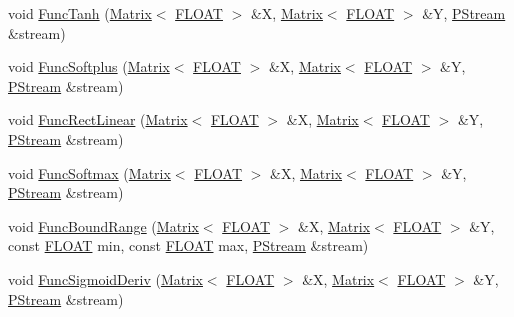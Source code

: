 \begin{DoxyCompactItemize}
\item 
void \hyperlink{classfractal_1_1Engine_a62e164f627f2290f13762c4f0b8df066}{Func\+Tanh} (\hyperlink{classfractal_1_1Matrix}{Matrix}$<$ \hyperlink{namespacefractal_a1c2d2530689575d5ccb56bae52af70d3}{F\+L\+O\+A\+T} $>$ \&X, \hyperlink{classfractal_1_1Matrix}{Matrix}$<$ \hyperlink{namespacefractal_a1c2d2530689575d5ccb56bae52af70d3}{F\+L\+O\+A\+T} $>$ \&Y, \hyperlink{classfractal_1_1PStream}{P\+Stream} \&stream)
\item 
void \hyperlink{classfractal_1_1Engine_a718512834ed660d461fea57dc89a9e75}{Func\+Softplus} (\hyperlink{classfractal_1_1Matrix}{Matrix}$<$ \hyperlink{namespacefractal_a1c2d2530689575d5ccb56bae52af70d3}{F\+L\+O\+A\+T} $>$ \&X, \hyperlink{classfractal_1_1Matrix}{Matrix}$<$ \hyperlink{namespacefractal_a1c2d2530689575d5ccb56bae52af70d3}{F\+L\+O\+A\+T} $>$ \&Y, \hyperlink{classfractal_1_1PStream}{P\+Stream} \&stream)
\item 
void \hyperlink{classfractal_1_1Engine_ab47e0aa39c3aa8733a55aaee6adb9171}{Func\+Rect\+Linear} (\hyperlink{classfractal_1_1Matrix}{Matrix}$<$ \hyperlink{namespacefractal_a1c2d2530689575d5ccb56bae52af70d3}{F\+L\+O\+A\+T} $>$ \&X, \hyperlink{classfractal_1_1Matrix}{Matrix}$<$ \hyperlink{namespacefractal_a1c2d2530689575d5ccb56bae52af70d3}{F\+L\+O\+A\+T} $>$ \&Y, \hyperlink{classfractal_1_1PStream}{P\+Stream} \&stream)
\item 
void \hyperlink{classfractal_1_1Engine_a36831f905f730fe773ecf64bc668507e}{Func\+Softmax} (\hyperlink{classfractal_1_1Matrix}{Matrix}$<$ \hyperlink{namespacefractal_a1c2d2530689575d5ccb56bae52af70d3}{F\+L\+O\+A\+T} $>$ \&X, \hyperlink{classfractal_1_1Matrix}{Matrix}$<$ \hyperlink{namespacefractal_a1c2d2530689575d5ccb56bae52af70d3}{F\+L\+O\+A\+T} $>$ \&Y, \hyperlink{classfractal_1_1PStream}{P\+Stream} \&stream)
\item 
void \hyperlink{classfractal_1_1Engine_aa40050d410d71f97873bc98fb5086a82}{Func\+Bound\+Range} (\hyperlink{classfractal_1_1Matrix}{Matrix}$<$ \hyperlink{namespacefractal_a1c2d2530689575d5ccb56bae52af70d3}{F\+L\+O\+A\+T} $>$ \&X, \hyperlink{classfractal_1_1Matrix}{Matrix}$<$ \hyperlink{namespacefractal_a1c2d2530689575d5ccb56bae52af70d3}{F\+L\+O\+A\+T} $>$ \&Y, const \hyperlink{namespacefractal_a1c2d2530689575d5ccb56bae52af70d3}{F\+L\+O\+A\+T} min, const \hyperlink{namespacefractal_a1c2d2530689575d5ccb56bae52af70d3}{F\+L\+O\+A\+T} max, \hyperlink{classfractal_1_1PStream}{P\+Stream} \&stream)
\item 
void \hyperlink{classfractal_1_1Engine_a0b83e5e468d5cebe5dbe101d3105e5c3}{Func\+Sigmoid\+Deriv} (\hyperlink{classfractal_1_1Matrix}{Matrix}$<$ \hyperlink{namespacefractal_a1c2d2530689575d5ccb56bae52af70d3}{F\+L\+O\+A\+T} $>$ \&X, \hyperlink{classfractal_1_1Matrix}{Matrix}$<$ \hyperlink{namespacefractal_a1c2d2530689575d5ccb56bae52af70d3}{F\+L\+O\+A\+T} $>$ \&Y, \hyperlink{classfractal_1_1PStream}{P\+Stream} \&stream)

\end{DoxyCompactItemize}
